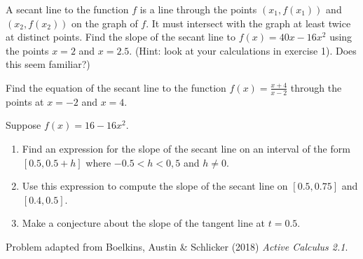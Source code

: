 \documentclass{ximera}
\begin{document}
\begin{exercise} 
A secant line to the function $f$ is a line through the points $(x_1, f(x_1))$ and $(x_2, f(x_2))$ on the graph of $f$.  It must intersect with the graph at least twice at distinct points.  Find the slope of the secant line to $f(x)=40x-16x^2$ using the points $x=2$ and $x=2.5$. (Hint: look at your calculations in exercise 1).  Does this seem familiar?) 
\end{exercise}

\begin{exercise}
  Find the equation of the secant line to the function $f(x)=\frac{x+4}{x-2}$ through the points at $x=-2$ and $x=4$.
\end{exercise}

\begin{exercise}
  Suppose $f(x)=16-16x^2$.
  \begin{enumerate}
    \item Find an expression for the slope of the secant line on an interval of the form $[0.5, 0.5+h]$ where $-0.5<h<0,5$ and $h\neq 0$.
    \item Use this expression to compute the slope of the secant line on $[0.5, 0.75]$ and $[0.4, 0.5]$.
    \item Make a conjecture about the slope of the tangent line at $t=0.5$. 
  \end{enumerate}
  Problem adapted from Boelkins, Austin \& Schlicker (2018) \textit{Active Calculus 2.1}.
\end{exercise}
\end{document}
